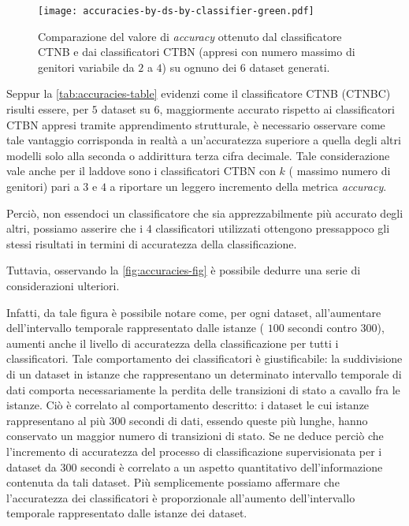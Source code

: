 \begin{figure}
	\centering
	\texttt{[image: accuracies-by-ds-by-classifier-green.pdf]}
	\caption[Accuratezza dei classificatori \acs{CTBN} e \acs{CTNB}]{Comparazione del valore di \emph{accuracy} ottenuto dal classificatore \acs{CTNB} e dai classificatori \acs{CTBN} (appresi con numero massimo di genitori variabile da $2$ a $4$) su ognuno dei $6$ dataset generati.}\label{fig:accuracies-fig}
\end{figure}
Seppur la \vref{tab:accuracies-table} evidenzi come il classificatore \acs{CTNB} (\acs{CTNBC}) risulti essere, per $5$ dataset su $6$, maggiormente accurato rispetto ai classificatori \acs{CTBN} appresi tramite apprendimento strutturale, è necessario osservare come tale vantaggio corrisponda in realtà a un'accuratezza superiore a quella degli altri modelli solo alla seconda o addirittura terza cifra decimale. Tale considerazione vale anche per il  laddove sono i classificatori \acs{CTBN} con $k$ (\ie{} massimo numero di genitori) pari a $3$ e $4$ a riportare un leggero incremento della metrica \emph{accuracy}.

Perciò, non essendoci un classificatore che sia apprezzabilmente più accurato degli altri, possiamo asserire che i $4$ classificatori utilizzati ottengono pressappoco gli stessi risultati in termini di accuratezza della classificazione.

Tuttavia, osservando la \vref{fig:accuracies-fig} è possibile dedurre una serie di considerazioni ulteriori.

Infatti, da tale figura è possibile notare come, per ogni dataset, all'aumentare dell'intervallo temporale rappresentato dalle istanze (\ie{} $100$ secondi contro $300$), aumenti anche il livello di accuratezza della classificazione per tutti i classificatori. Tale comportamento dei classificatori è giustificabile: la suddivisione di un dataset in istanze che rappresentano un determinato intervallo temporale di dati comporta necessariamente la perdita delle transizioni di stato a cavallo fra le istanze. Ciò è correlato al comportamento descritto: i dataset le cui istanze rappresentano al più $300$ secondi di dati, essendo queste più lunghe, hanno conservato un maggior numero di transizioni di stato. Se ne deduce perciò che l'incremento di accuratezza del processo di classificazione supervisionata per i dataset da $300$ secondi è correlato a un aspetto quantitativo dell'informazione contenuta da tali dataset. Più semplicemente possiamo affermare che l'accuratezza dei classificatori è proporzionale all'aumento dell'intervallo temporale rappresentato dalle istanze dei dataset.


